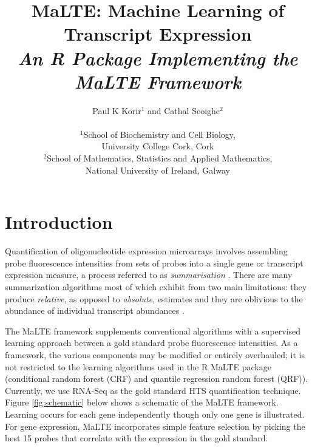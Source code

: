 \documentclass[a4paper,12pt]{article}
\title{\textbf{MaLTE: Machine Learning of Transcript Expression}\\\textit{An \textsf{R} Package Implementing the MaLTE Framework}}
\author{Paul K Korir$^{1}$ and Cathal Seoighe$^2$\\
\\
$^{1}$School of Biochemistry and Cell Biology,\\
University College Cork, Cork \\
$^{2}$School of Mathematics, Statistics and Applied Mathematics,\\
National University of Ireland, Galway
}
\date{}
\begin{document}
\maketitle

\newpage

\tableofcontents

\newpage


\section{Introduction}
\label{introduction}
Quantification of oligonucleotide expression microarrays involves assembling probe fluorescence intensities from sets of probes into a single gene or transcript expression measure, a process referred to as \textit{summarisation} \cite{irizarry2003summaries}. There are many summarization algorithms \cite{irizarry2006comparison} most of which exhibit from two main limitations: they produce \textit{relative}, as opposed to \textit{absolute}, estimates \cite{irizarry2005multiple, fu2009estimating} and they are oblivious to the abundance of individual transcript abundances \cite{malone2011microarrays}. 

The \textsf{MaLTE} framework supplements conventional algorithms with a supervised learning approach between a gold standard probe fluorescence intensities. As a framework, the various components may be modified or entirely overhauled; it is not restricted to the learning algorithms used in the \textsf{R} \textsf{MaLTE} package (conditional random forest (CRF) and quantile regression random forest (QRF)). Currently, we use RNA-Seq as the gold standard HTS quantification technique. Figure \ref{fig:schematic} below shows a schematic of the \textsf{MaLTE} framework. Learning occurs for each gene independently though only one gene is illustrated. For gene expression, \textsf{MaLTE} incorporates simple feature selection by picking the best 15 probes that correlate with the expression in the gold standard.
\end{document}
